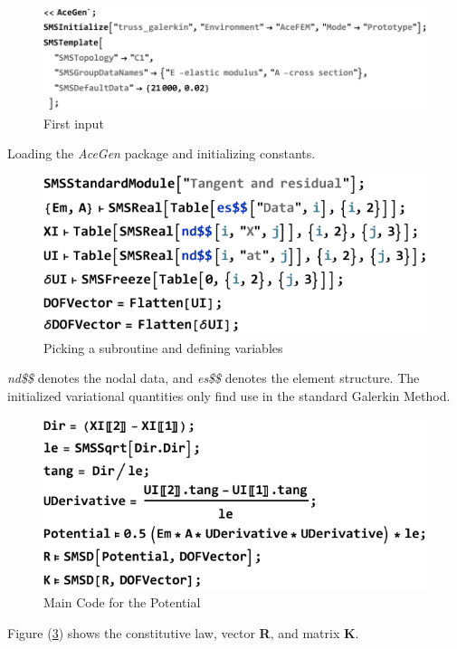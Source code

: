 \begin{figure}[htb]
	\includegraphics{figures/acegen_input_1}
	\caption{First input}
	\label{fig:first_input}
\end{figure}

Loading the \textit{AceGen} package and initializing constants.


\begin{figure}[htb]
	\includegraphics{figures/acegen_input_2}
	\caption{Picking a subroutine and defining variables}
	\label{fig:subroutine}
\end{figure}

\textit{nd\$\$} denotes the nodal data, and \textit{es\$\$} denotes the element structure.
The initialized variational quantities only find use in the standard Galerkin Method.  

\begin{figure}[htb]
	\includegraphics{figures/potentialcode}
	\caption{Main Code for the Potential}
	\label{fig:potential}
\end{figure}
Figure (\ref{fig:potential}) shows the constitutive law, vector \textbf{R}, and matrix \textbf{K}.

